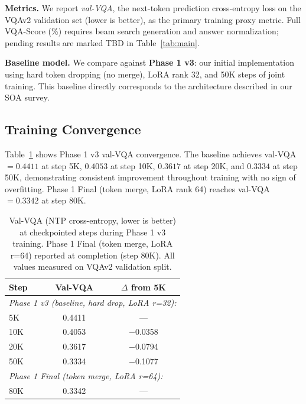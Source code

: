 \documentclass{article}
\begin{document}
\textbf{Metrics.}
We report \emph{val-VQA}, the next-token prediction cross-entropy loss on the VQAv2
validation set (lower is better), as the primary training proxy metric.
Full VQA-Score (\%) requires beam search generation and answer normalization;
pending results are marked TBD in Table~\ref{tab:main}.

\textbf{Baseline model.}
We compare against \textbf{Phase 1 v3}: our initial implementation using hard token
dropping (no merge), LoRA rank 32, and 50K steps of joint training.
This baseline directly corresponds to the architecture described in our SOA survey.

\subsection{Training Convergence}

Table~\ref{tab:curve} shows Phase 1 v3 val-VQA convergence.
The baseline achieves val-VQA $= 0.4411$ at step 5K, $0.4053$ at step 10K,
$0.3617$ at step 20K, and $0.3334$ at step 50K, demonstrating consistent improvement
throughout training with no sign of overfitting.
Phase 1 Final (token merge, LoRA rank 64) reaches val-VQA $= 0.3342$ at step 80K.

\begin{table}[t]
\caption{Val-VQA (NTP cross-entropy, lower is better) at checkpointed steps during
Phase 1 v3 training. Phase 1 Final (token merge, LoRA r=64) reported at completion
(step 80K). All values measured on VQAv2 validation split.}
\label{tab:curve}
\vskip 0.1in
\centering
\begin{small}
\begin{tabular}{lcc}
\toprule
\textbf{Step} & \textbf{Val-VQA} & \textbf{$\Delta$ from 5K} \\
\midrule
\multicolumn{3}{l}{\textit{Phase 1 v3 (baseline, hard drop, LoRA r=32):}} \\
5K   & 0.4411 & — \\
10K  & 0.4053 & $-$0.0358 \\
20K  & 0.3617 & $-$0.0794 \\
50K  & 0.3334 & $-$0.1077 \\
\midrule
\multicolumn{3}{l}{\textit{Phase 1 Final (token merge, LoRA r=64):}} \\
80K  & 0.3342 & — \\
\bottomrule
\end{tabular}
\end{small}
\end{table}
\end{document}
